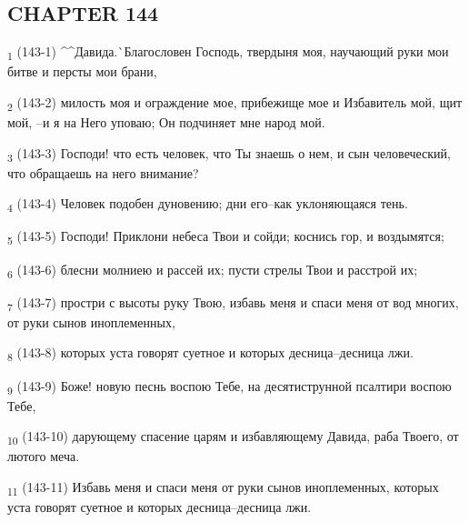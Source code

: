 \subsection{CHAPTER 144}
\begin{tcolorbox}
\textsubscript{1} (143-1) ^^Давида.^^ Благословен Господь, твердыня моя, научающий руки мои битве и персты мои брани,
\end{tcolorbox}
\begin{tcolorbox}
\textsubscript{2} (143-2) милость моя и ограждение мое, прибежище мое и Избавитель мой, щит мой, --и я на Него уповаю; Он подчиняет мне народ мой.
\end{tcolorbox}
\begin{tcolorbox}
\textsubscript{3} (143-3) Господи! что есть человек, что Ты знаешь о нем, и сын человеческий, что обращаешь на него внимание?
\end{tcolorbox}
\begin{tcolorbox}
\textsubscript{4} (143-4) Человек подобен дуновению; дни его--как уклоняющаяся тень.
\end{tcolorbox}
\begin{tcolorbox}
\textsubscript{5} (143-5) Господи! Приклони небеса Твои и сойди; коснись гор, и воздымятся;
\end{tcolorbox}
\begin{tcolorbox}
\textsubscript{6} (143-6) блесни молниею и рассей их; пусти стрелы Твои и расстрой их;
\end{tcolorbox}
\begin{tcolorbox}
\textsubscript{7} (143-7) простри с высоты руку Твою, избавь меня и спаси меня от вод многих, от руки сынов иноплеменных,
\end{tcolorbox}
\begin{tcolorbox}
\textsubscript{8} (143-8) которых уста говорят суетное и которых десница--десница лжи.
\end{tcolorbox}
\begin{tcolorbox}
\textsubscript{9} (143-9) Боже! новую песнь воспою Тебе, на десятиструнной псалтири воспою Тебе,
\end{tcolorbox}
\begin{tcolorbox}
\textsubscript{10} (143-10) дарующему спасение царям и избавляющему Давида, раба Твоего, от лютого меча.
\end{tcolorbox}
\begin{tcolorbox}
\textsubscript{11} (143-11) Избавь меня и спаси меня от руки сынов иноплеменных, которых уста говорят суетное и которых десница--десница лжи.
\end{tcolorbox}
